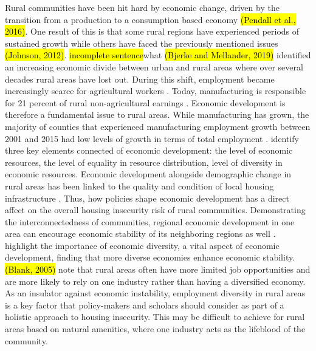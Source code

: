 Rural communities have been hit hard by economic change, driven by the transition from a production to a consumption based economy \hl{(Pendall et al., 2016)}. One result of this is that some rural regions have experienced periods of sustained growth while others have faced the previously mentioned issues \hl{(Johnson, 2012)}. \hl{incomplete sentence}what \hl{(Bjerke and Mellander, 2019)} identified an increasing economic divide between urban and rural areas where over several decades rural areas have lost out. During this shift, employment became increasingly scarce for agricultural workers \citep{kropczynski_insights_2012}. Today, manufacturing is responsible for 21 percent of rural non-agricultural earnings \citep{low_rural_2017}. Economic development is therefore a fundamental issue to rural areas. While manufacturing has grown, the majority of counties that experienced manufacturing employment growth between 2001 and 2015 had low levels of growth in terms of total employment \citep{low_rural_2017}. \citet{sherrieb_measuring_2010} identify three key elements connected of economic development: the level of economic resources, the level of equality in resource distribution, level of diversity in economic resources. Economic development alongside demographic change in rural areas has been linked to the quality and condition of local housing infrastructure \citep{barcus_heterogeneity_2011}. Thus, how policies shape economic development has a direct affect on the overall housing insecurity risk of rural communities. Demonstrating the interconnectedness of communities, regional economic development in one area can encourage economic stability of its neighboring regions as well \citep{chen_economic_2018}. \citet{deller_spatial_2016} highlight the importance of economic diversity, a vital aspect of economic development, finding that more diverse economies enhance economic stability. \hl{(Blank, 2005)} note that rural areas often have more limited job opportunities and are more likely to rely on one industry rather than having a diversified economy. As an insulator against economic instability, employment diversity in rural areas is a key factor that policy-makers and scholars should consider as part of a holistic approach to housing insecurity. This may be difficult to achieve for rural areas based on natural amenities, where one industry acts as the lifeblood of the community. 

 


